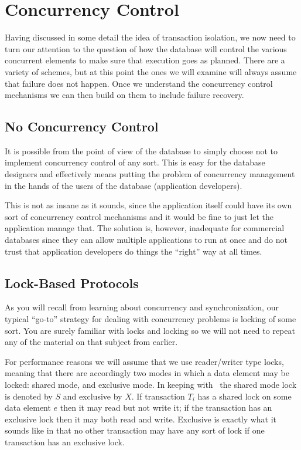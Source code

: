 




\section*{Concurrency Control}

Having discussed in some detail the idea of transaction isolation, we now need to turn our attention to the question of how the database will control the various concurrent elements to make sure that execution goes as planned. There are a variety of schemes, but at this point the ones we will examine will always assume that failure does not happen. Once we understand the concurrency control mechanisms we can then build on them to include failure recovery.

\subsection*{No Concurrency Control}

It is possible from the point of view of the database to simply choose not to implement concurrency control of any sort. This is easy for the database designers and effectively means putting the problem of concurrency management in the hands of the users of the database (application developers). 

This is not as insane as it sounds, since the application itself could have its own sort of concurrency control mechanisms and it would be fine to just let the application manage that. The solution is, however, inadequate for commercial databases since they can allow multiple applications to run at once and do not trust that application developers do things the ``right'' way at all times. 

\subsection*{Lock-Based Protocols}

As you will recall from learning about concurrency and synchronization, our typical ``go-to'' strategy for dealing with concurrency problems is locking of some sort. You are surely familiar with locks and locking so we will not need to repeat any of the material on that subject from earlier. 

For performance reasons we will assume that we use reader/writer type locks, meaning that there are accordingly two modes in which a data element may be locked: shared mode, and exclusive mode. In keeping with~\cite{dsc} the shared mode lock is denoted by $S$ and exclusive by $X$. If transaction $T_{i}$ has a shared lock on some data element $e$ then it may read but not write it; if the transaction has an exclusive lock then it may both read and write. Exclusive is exactly what it sounds like in that no other transaction may have any sort of lock if one transaction has an exclusive lock.

